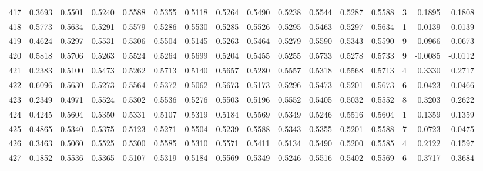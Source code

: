 \begin{tabular}{lrrrrrrrrrrrrrrr}
417 &      0.3693 &  0.5501 &  0.5240 &  0.5588 &  0.5355 &  0.5118 &  0.5264 &  0.5490 &  0.5238 &  0.5544 &   0.5287 &     0.5588 &      3 &                    0.1895 &                     0.1808 \\
418 &      0.5773 &  0.5634 &  0.5291 &  0.5579 &  0.5286 &  0.5530 &  0.5285 &  0.5526 &  0.5295 &  0.5463 &   0.5297 &     0.5634 &      1 &                   -0.0139 &                    -0.0139 \\
419 &      0.4624 &  0.5297 &  0.5531 &  0.5306 &  0.5504 &  0.5145 &  0.5263 &  0.5464 &  0.5279 &  0.5590 &   0.5343 &     0.5590 &      9 &                    0.0966 &                     0.0673 \\
420 &      0.5818 &  0.5706 &  0.5263 &  0.5524 &  0.5264 &  0.5699 &  0.5204 &  0.5455 &  0.5255 &  0.5733 &   0.5278 &     0.5733 &      9 &                   -0.0085 &                    -0.0112 \\
421 &      0.2383 &  0.5100 &  0.5473 &  0.5262 &  0.5713 &  0.5140 &  0.5657 &  0.5280 &  0.5557 &  0.5318 &   0.5568 &     0.5713 &      4 &                    0.3330 &                     0.2717 \\
422 &      0.6096 &  0.5630 &  0.5273 &  0.5564 &  0.5372 &  0.5062 &  0.5673 &  0.5173 &  0.5296 &  0.5473 &   0.5201 &     0.5673 &      6 &                   -0.0423 &                    -0.0466 \\
423 &      0.2349 &  0.4971 &  0.5524 &  0.5302 &  0.5536 &  0.5276 &  0.5503 &  0.5196 &  0.5552 &  0.5405 &   0.5032 &     0.5552 &      8 &                    0.3203 &                     0.2622 \\
424 &      0.4245 &  0.5604 &  0.5350 &  0.5331 &  0.5107 &  0.5319 &  0.5184 &  0.5569 &  0.5349 &  0.5246 &   0.5516 &     0.5604 &      1 &                    0.1359 &                     0.1359 \\
425 &      0.4865 &  0.5340 &  0.5375 &  0.5123 &  0.5271 &  0.5504 &  0.5239 &  0.5588 &  0.5343 &  0.5355 &   0.5201 &     0.5588 &      7 &                    0.0723 &                     0.0475 \\
426 &      0.3463 &  0.5060 &  0.5525 &  0.5300 &  0.5585 &  0.5310 &  0.5571 &  0.5411 &  0.5134 &  0.5490 &   0.5200 &     0.5585 &      4 &                    0.2122 &                     0.1597 \\
427 &      0.1852 &  0.5536 &  0.5365 &  0.5107 &  0.5319 &  0.5184 &  0.5569 &  0.5349 &  0.5246 &  0.5516 &   0.5402 &     0.5569 &      6 &                    0.3717 &                     0.3684 \\

\end{tabular}
